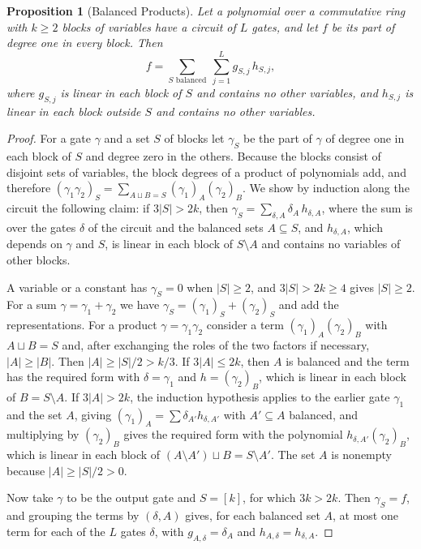 \documentclass[11pt,letterpaper]{report}
\theoremstyle{plain}
\newtheorem{proposition}[theorem]{Proposition}
\theoremstyle{definition}
\theoremstyle{remark}
\begin{document}
\begin{proposition}[Balanced Products]\label{pr:balanced}
Let a polynomial over a commutative ring with $k\ge2$ blocks of variables have a circuit of $L$ gates, and let $f$ be its part of degree one in every block. Then
\[
f=\sum_{S\text{ balanced}}\ \sum_{j=1}^{L}g_{S,j}\,h_{S,j},
\]
where $g_{S,j}$ is linear in each block of $S$ and contains no other variables, and $h_{S,j}$ is linear in each block outside $S$ and contains no other variables.
\end{proposition}
\begin{proof}
For a gate $\gamma$ and a set $S$ of blocks let $\gamma_S$ be the part of $\gamma$ of degree one in each block of $S$ and degree zero in the others. Because the blocks consist of disjoint sets of variables, the block degrees of a product of polynomials add, and therefore $(\gamma_1\gamma_2)_S=\sum_{A\sqcup B=S}(\gamma_1)_A(\gamma_2)_B$. We show by induction along the circuit the following claim: if $3|S|>2k$, then $\gamma_S=\sum_{\delta,A}\delta_A\,h_{\delta,A}$, where the sum is over the gates $\delta$ of the circuit and the balanced sets $A\subseteq S$, and $h_{\delta,A}$, which depends on $\gamma$ and $S$, is linear in each block of $S\setminus A$ and contains no variables of other blocks.

A variable or a constant has $\gamma_S=0$ when $|S|\ge2$, and $3|S|>2k\ge4$ gives $|S|\ge2$. For a sum $\gamma=\gamma_1+\gamma_2$ we have $\gamma_S=(\gamma_1)_S+(\gamma_2)_S$ and add the representations. For a product $\gamma=\gamma_1\gamma_2$ consider a term $(\gamma_1)_A(\gamma_2)_B$ with $A\sqcup B=S$ and, after exchanging the roles of the two factors if necessary, $|A|\ge|B|$. Then $|A|\ge|S|/2>k/3$. If $3|A|\le2k$, then $A$ is balanced and the term has the required form with $\delta=\gamma_1$ and $h=(\gamma_2)_B$, which is linear in each block of $B=S\setminus A$. If $3|A|>2k$, the induction hypothesis applies to the earlier gate $\gamma_1$ and the set $A$, giving $(\gamma_1)_A=\sum\delta_{A'}h_{\delta,A'}$ with $A'\subseteq A$ balanced, and multiplying by $(\gamma_2)_B$ gives the required form with the polynomial $h_{\delta,A'}(\gamma_2)_B$, which is linear in each block of $(A\setminus A')\sqcup B=S\setminus A'$. The set $A$ is nonempty because $|A|\ge|S|/2>0$.

Now take $\gamma$ to be the output gate and $S=[k]$, for which $3k>2k$. Then $\gamma_S=f$, and grouping the terms by $(\delta,A)$ gives, for each balanced set $A$, at most one term for each of the $L$ gates $\delta$, with $g_{A,\delta}=\delta_A$ and $h_{A,\delta}=h_{\delta,A}$.
\end{proof}
\end{document}
